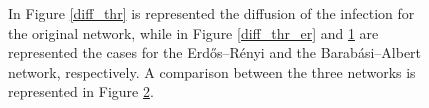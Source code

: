 \begin{figure}[H]
        \begin{subfigure}{0.33\textwidth}
            \caption{}
            \label{diff_thr_ba}
        \end{subfigure}
        \begin{subfigure}{0.33\textwidth}
            \caption{}
            \label{diff_thr_comparison}
        \end{subfigure}
        \caption{In Figure \ref{diff_thr} is represented the diffusion of the infection for the original network,
        while in Figure \ref{diff_thr_er} and \ref{diff_thr_ba} are represented the cases for the Erdős–Rényi and
        the Barabási–Albert network, respectively. A comparison between the three networks is represented in Figure
        \ref{diff_thr_comparison}.}
        \label{diff_thr_total}
    \end{figure}

